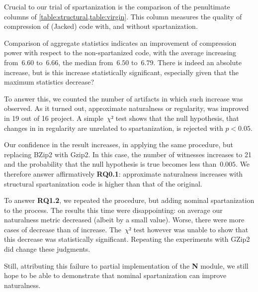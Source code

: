 Crucial to our trial of spartanization is the comparison of the penultimate
columns of \cref{table:structural,table:virgin}.
This column measures the quality of compression of (Jacked) code
with, and without spartanization.

Comparison of aggregate statistics indicates an improvement of compression
power with respect to the non-spartanized code, with the average increasing
from~$6.60$ to~$6.66$, the median from~$6.50$ to~$6.79$. There is indeed an
absolute increase, but is this increase statistically significant, especially
given that the maximum statistics decrease?

To answer this, we counted the number of artifacts in which such increase was
observed. As it turned out, approximate naturalness or regularity, was improved
in 19 out of 16 project. A simple~$χ²$ test shows that the null hypothesis,
that changes in in regularity are unrelated to spartanization, is rejected 
with $p < 0.05$. 

Our confidence in the result increases, in applying the same procedure, but
replacing BZip2 with Gzip2. In this case, the number of witnesses increases 
to 21 and the probability that the null hypothesis is true becomes 
less than~$0.005$. We therefore answer affirmatively \textbf{RQ0.1}:
approximate naturalness increases with structural spartanization code is higher
than that of the original.

To answer \textbf{RQ1.2}, we repeated the procedure, but adding nominal
spartanization to the process. The results this time were disappointing:
on average our naturalness metric decreased (albeit by a small value).
Worse, there were more cases of decrease than of increase. The~$χ²$ test
however was unable to show that this decrease was statistically significant. 
Repeating the experiments with GZip2 did change these judgments.

Still, attributing this failure to partial implementation of the \textbf{N}
module, we still hope to be able to demonstrate that nominal spartanization 
can improve naturalness.
\endinput

The first column of \cref{table:comparisons-original} refers to the application
of the Jack algorithm to the spartanized code. As we can see some of these values are negative - particularly
average, max value and range.
A negative value for the average of the Jack compression powers implies that,
on average, spartanized code is less prone to be compressed by Jack tha original code.
Negative values for max compression and range, that are of course related values, means
that there is a significant difference, for some projects, in the degree of compression
that Jack might achieved on spartanized code.

